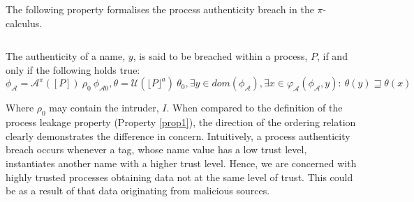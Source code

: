 \documentclass[10pt,a4paper,final,oneside,fleqn]{book}
\begin{document}
The following property formalises the process authenticity breach in the $\pi$-calculus.
\begin{prop}
$ $

\noindent
The authenticity of a name, $y$, is said to be breached within a process, $P$, if and only if the following holds true:\\
$\phi_\mathcal{A}=\mathcal{A}^\pi(\![P]\!)~\rho_0~\phi_{\mathcal{A}0},\theta=\mathcal{U}(\lfloor P\rfloor^a)~\theta_0,\exists y\in dom(\phi_\mathcal{A}),\exists x\in\varphi_\mathcal{A}(\phi_\mathcal{A},y):~\theta(y)\sqsupseteq\theta(x)$
\end{prop}
Where $\rho_0$ may contain the intruder, $I$.  When compared to the definition of the process leakage property (Property \ref{prop1}), the direction of the ordering relation clearly demonstrates the difference in concern. Intuitively, a process authenticity breach occurs whenever a tag, whose name value has a low trust level, instantiates another name with a higher trust level. Hence, we are concerned with highly trusted processes obtaining data not at the same level of trust.  This could be as a result of that data originating from malicious sources.
\end{document}
